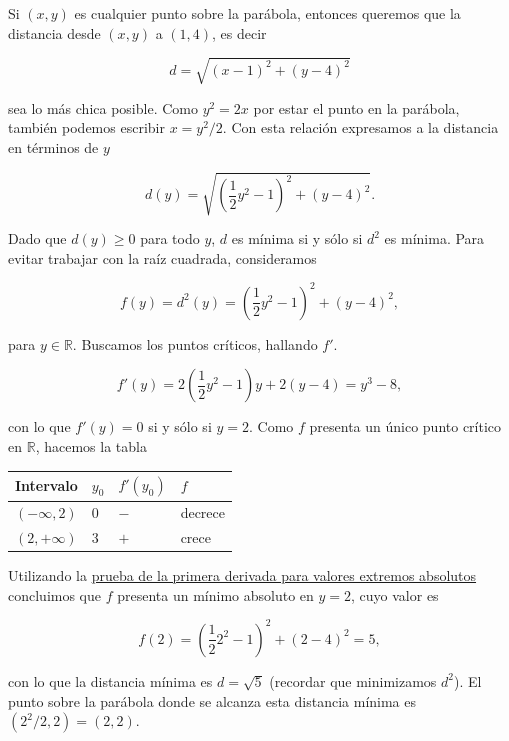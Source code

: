 \documentclass[
  letterpaper,
]{book}
\theoremstyle{plain}
\theoremstyle{remark}
\begin{document}
\begin{tcolorbox}[enhanced jigsaw, opacityback=0, left=2mm, opacitybacktitle=0.6, toprule=.15mm, bottomrule=.15mm, colbacktitle=quarto-callout-tip-color!10!white, titlerule=0mm, bottomtitle=1mm, title=\textcolor{quarto-callout-tip-color}{\faLightbulb}\hspace{0.5em}{Solución}, toptitle=1mm, colframe=quarto-callout-tip-color-frame, colback=white, breakable, rightrule=.15mm, arc=.35mm, leftrule=.75mm, coltitle=black]

Si \((x,y)\) es cualquier punto sobre la parábola, entonces queremos que
la distancia desde \((x,y)\) a \((1,4)\), es decir

\[
d=\sqrt{(x-1)^2+(y-4)^2}
\]

sea lo más chica posible. Como \(y^2=2x\) por estar el punto en la
parábola, también podemos escribir \(x=y^2/2\). Con esta relación
expresamos a la distancia en términos de \(y\)

\[
d(y)=\sqrt{\left(\frac{1}{2}y^2-1\right)^2+(y-4)^2}.
\]

Dado que \(d(y)\geq 0\) para todo \(y\), \(d\) es mínima si y sólo si
\(d^2\) es mínima. Para evitar trabajar con la raíz cuadrada,
consideramos

\[
f(y)=d^2(y)=\left(\frac{1}{2}y^2-1\right)^2+(y-4)^2,
\]

para \(y\in \mathbb{R}\). Buscamos los puntos críticos, hallando \(f'\).

\[
f'(y)=2\left(\frac{1}{2}y^2-1\right)y+2(y-4)=y^3-8,
\]

con lo que \(f'(y)=0\) si y sólo si \(y=2\). Como \(f\) presenta un
único punto crítico en \(\mathbb{R}\), hacemos la tabla

\begin{longtable}[]{@{}llll@{}}
\toprule\noalign{}
Intervalo & \(y_0\) & \(f'(y_0)\) & \(f\) \\
\midrule\noalign{}
\endhead
\bottomrule\noalign{}
\endlastfoot
\((-\infty,2)\) & \(0\) & \(-\) & decrece \\
\((2,+\infty)\) & \(3\) & \(+\) & crece \\
\end{longtable}

Utilizando la \hyperref[teo-primerader-global]{prueba de la primera
derivada para valores extremos absolutos} concluimos que \(f\) presenta
un mínimo absoluto en \(y=2\), cuyo valor es

\[
f(2)=\left(\frac{1}{2}2^2-1\right)^2+(2-4)^2=5,
\]

con lo que la distancia mínima es \(d=\sqrt{5}\) (recordar que
minimizamos \(d^2\)). El punto sobre la parábola donde se alcanza esta
distancia mínima es \((2^2/2,2)=(2,2)\).

\end{tcolorbox}
\end{document}
